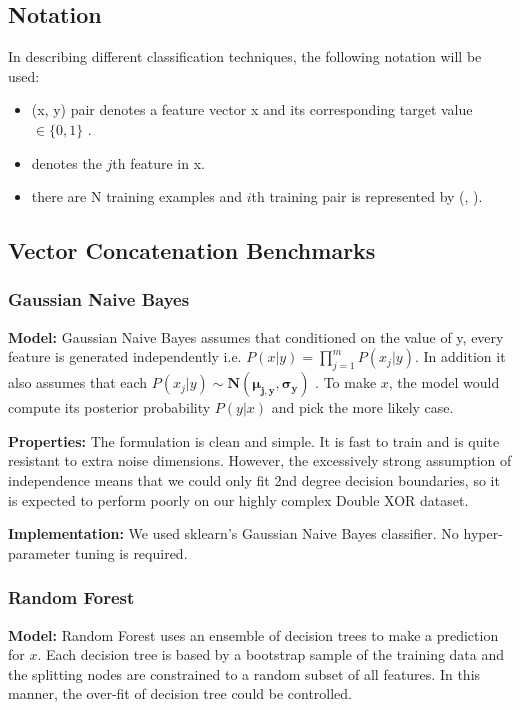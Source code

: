 \documentclass{article}
\begin{document}
\subsection*{Notation}
In describing different classification techniques, the following notation will
be used:
\begin{itemize}
\setlength\itemsep{0em}
\item (x, y) pair denotes a feature vector x \mmin {} and its
    corresponding target value $\in \{0, 1\}$ .
\item {} denotes the $j$th feature in x.
\item there are N training examples and $i$th training pair is represented by
    (,  ).
\end{itemize}


\subsection*{Vector Concatenation Benchmarks}

\subsubsection*{Gaussian Naive Bayes}
\textbf{Model:}
Gaussian Naive Bayes assumes that conditioned on the value of y, every feature
 is generated independently i.e. $P(x|y) = \prod_{j=1}^{m} P(x_j|y)$. In
addition it also assumes that each $P(x_j|y) \sim \mathbf{N(\mu_{j,y},
    \sigma_y)}$ . To make $x$, the model would compute its posterior probability
$P(y|x)$ and pick the more likely case.

\textbf{Properties:}
The formulation is clean and simple. It is fast to train and is quite resistant
to extra noise dimensions. However, the excessively strong assumption of
independence means that we could only fit 2nd degree decision boundaries, so it
is expected to perform poorly on our highly complex Double XOR dataset.

\textbf{Implementation:}
We used sklearn's Gaussian Naive Bayes classifier. No hyper-parameter tuning is
required.

\subsubsection*{Random Forest}
\textbf{Model:}
Random Forest uses an ensemble of decision trees to make a prediction for $x$.
Each decision tree is based by a bootstrap sample of the training data and the
splitting nodes are constrained to a random subset of all features. In this
manner, the over-fit of decision tree could be controlled.
\end{document}
